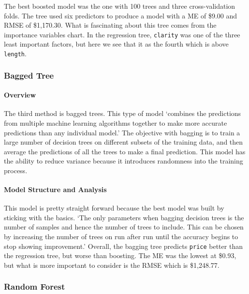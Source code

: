 \documentclass[
  paper=a4,
  ,captions=tableheading
]{scrartcl}
\begin{document}
The best boosted model was the one with 100 trees and three
cross-validation folds. The tree used six predictors to produce a model
with a ME of \$9.00 and RMSE of \$1,170.30. What is fascinating about
this tree comes from the importance variables chart. In the regression
tree, \texttt{clarity} was one of the three least important factors, but
here we see that it as the fourth which is above \texttt{length}.

\hypertarget{bagged-tree}{%
\subsubsection{Bagged Tree}\label{bagged-tree}}

\hypertarget{overview-2}{%
\paragraph{Overview}\label{overview-2}}

The third method is bagged trees. This type of model `combines the
predictions from multiple machine learning algorithms together to make
more accurate predictions than any individual model.' The objective with
bagging is to train a large number of decision trees on different
subsets of the training data, and then average the predictions of all
the trees to make a final prediction. This model has the ability to
reduce variance because it introduces randomness into the training
process.

\hypertarget{model-structure-and-analysis-2}{%
\paragraph{Model Structure and
Analysis}\label{model-structure-and-analysis-2}}

This model is pretty straight forward because the best model was built
by sticking with the basics. `The only parameters when bagging decision
trees is the number of samples and hence the number of trees to include.
This can be chosen by increasing the number of trees on run after run
until the accuracy begins to stop showing improvement.' Overall, the
bagging tree predicts \texttt{price} better than the regression tree,
but worse than boosting. The ME was the lowest at \$0.93, but what is
more important to consider is the RMSE which is \$1,248.77.

\hypertarget{random-forest}{%
\subsubsection{Random Forest}\label{random-forest}}
\end{document}
